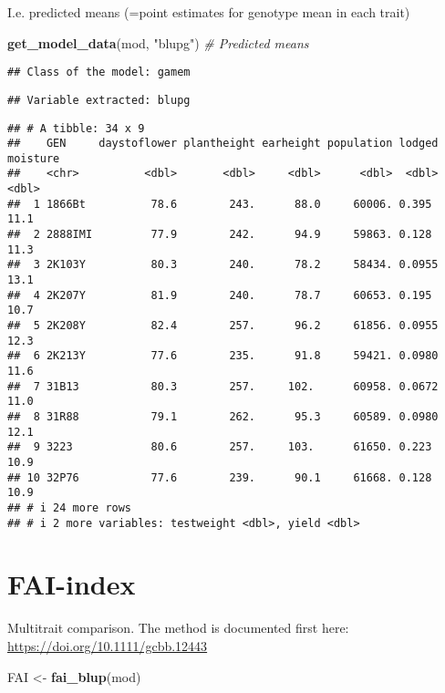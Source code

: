 \documentclass[
]{article}
\newenvironment{Shaded}{\begin{snugshade}}{\end{snugshade}}
\newcommand{\CommentTok}[1]{\textcolor[rgb]{0.56,0.35,0.01}{\textit{#1}}}
\newcommand{\FunctionTok}[1]{\textcolor[rgb]{0.13,0.29,0.53}{\textbf{#1}}}
\newcommand{\NormalTok}[1]{#1}
\newcommand{\OtherTok}[1]{\textcolor[rgb]{0.56,0.35,0.01}{#1}}
\newcommand{\StringTok}[1]{\textcolor[rgb]{0.31,0.60,0.02}{#1}}
\begin{document}
I.e. predicted means (=point estimates for genotype mean in each trait)

\begin{Shaded}
\begin{Highlighting}[]
\FunctionTok{get\_model\_data}\NormalTok{(mod, }\StringTok{"blupg"}\NormalTok{) }\CommentTok{\# Predicted means}
\end{Highlighting}
\end{Shaded}

\begin{verbatim}
## Class of the model: gamem
\end{verbatim}

\begin{verbatim}
## Variable extracted: blupg
\end{verbatim}

\begin{verbatim}
## # A tibble: 34 x 9
##    GEN     daystoflower plantheight earheight population lodged moisture
##    <chr>          <dbl>       <dbl>     <dbl>      <dbl>  <dbl>    <dbl>
##  1 1866Bt          78.6        243.      88.0     60006. 0.395      11.1
##  2 2888IMI         77.9        242.      94.9     59863. 0.128      11.3
##  3 2K103Y          80.3        240.      78.2     58434. 0.0955     13.1
##  4 2K207Y          81.9        240.      78.7     60653. 0.195      10.7
##  5 2K208Y          82.4        257.      96.2     61856. 0.0955     12.3
##  6 2K213Y          77.6        235.      91.8     59421. 0.0980     11.6
##  7 31B13           80.3        257.     102.      60958. 0.0672     11.0
##  8 31R88           79.1        262.      95.3     60589. 0.0980     12.1
##  9 3223            80.6        257.     103.      61650. 0.223      10.9
## 10 32P76           77.6        239.      90.1     61668. 0.128      10.9
## # i 24 more rows
## # i 2 more variables: testweight <dbl>, yield <dbl>
\end{verbatim}

\section{FAI-index}\label{fai-index}

Multitrait comparison. The method is documented first here:
\url{https://doi.org/10.1111/gcbb.12443}

\begin{Shaded}
\begin{Highlighting}[]
\NormalTok{FAI }\OtherTok{\textless{}{-}} \FunctionTok{fai\_blup}\NormalTok{(mod)}
\end{Highlighting}
\end{Shaded}
\end{document}
